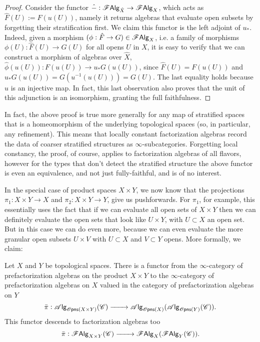 \documentclass[../text]{subfiles}
\begin{document}
\begin{proof}
    Consider the functor $\hat{-}: \mathscr{F} \mathsf{Alg}_{\hat{X}} \rightarrow \mathscr{F} \mathsf{Alg}_{X}$, which acts as $\hat{F}(U) := F(u(U))$, namely it returns algebras that evaluate open subsets by forgetting their stratification first. We claim this functor is the left adjoint of $u_*$. Indeed, given a morphism $(\phi: \hat{F} \rightarrow G) \in \mathscr{F} \mathsf{Alg}_{X}$, i.e. a family of morphisms $\phi(U): \hat{F}(U) \rightarrow G(U)$ for all opens $U$ in $X$, it is easy to verify that we can construct a morphism of algebras over $\hat{X}$, $\hat{\phi}(u(U)): F(u(U)) \rightarrow u_*G (u(U))$, since $\hat{F}(U) = F(u(U))$ and $u_*G(u(U)) = G(u^{-1}(u(U))) = G(U)$. The last equality holds because $u$ is an injective map. In fact, this last observation also proves that the unit of this adjunction is an isomorphism, granting the full faithfulness.
\end{proof}

\begin{remark}
    In fact, the above proof is true more generally for any map of stratified spaces that is a homeomorphism of the underlying topological spaces (so, in particular, any refinement). This means that locally constant factorization algebras record the data of coarser stratified structures as $\infty$-subcategories. Forgetting local constancy, the proof, of course, applies to factorization algebras of all flavors, however for the types that don't detect the stratified structure the above functor is even an equivalence, and not just fully-faithful, and is of no interest.
\end{remark}



In the special case of product spaces $X \times Y$, we now know that the projections $\pi_1: X \times Y \rightarrow X$ and $\pi_2: X \times Y \rightarrow Y$, give us pushforwards. For $\pi_1$, for example, this essentially uses the fact that if we can evaluate all open sets of $X \times Y$ then we can definitely evaluate the open sets that look like $U \times Y$, with $U \subset X$ an open set. But in this case we can do even more, because we can even evaluate the more granular open subsets $U \times V$ with $U \subset X$ and $V \subset Y$ opens. More formally, we claim:
%
\begin{proposition}\label{prop:exp_of_products}
    Let $X$ and $Y$ be topological spaces. There is a functor from the $\infty$-category of prefactorization algebras on the product $X \times Y$ to the $\infty$-category of prefactorization algebras on $X$ valued in the category of prefactorization algebras on $Y$
    \begin{equation}
        \bar{\pi}: \alg{\opens(X \times Y)}(\catC) \xrightarrow{\qquad} \alg{\opens(X)} (\alg{\opens(Y)} (\catC)).
    \end{equation}
    This functor descends to factorization algebras too
    \begin{equation}
        \bar{\pi}: \mathscr{F} \mathsf{Alg}_{X \times Y}(\mathscr{C}) \xrightarrow{\qquad} \mathscr{F} \mathsf{Alg}_{X}(\mathscr{F} \mathsf{Alg}_{Y}(\mathscr{C})).
    \end{equation}
\end{proposition}
\end{document}
